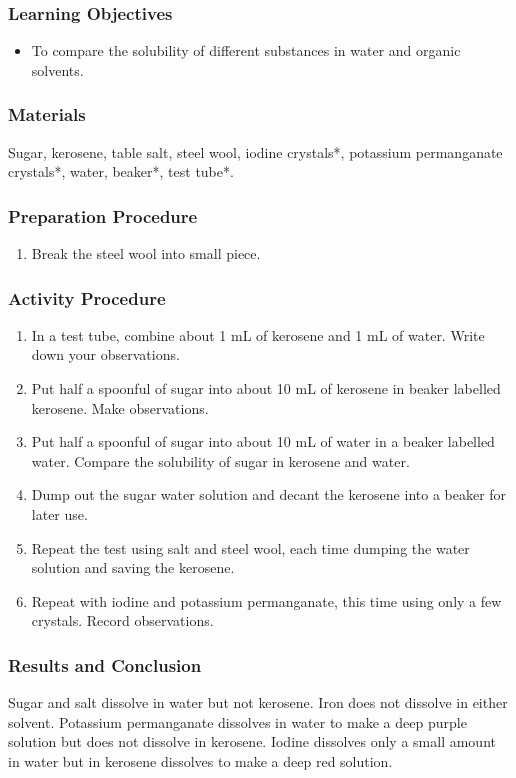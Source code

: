 \subsubsection*{Learning Objectives}
\begin{itemize}
\item{To compare the solubility of different substances in water and organic solvents.}
\end{itemize}

\subsubsection*{Materials}
Sugar, kerosene, table salt, steel wool, iodine crystals*, potassium permanganate crystals*, water, beaker*, test tube*.

\subsubsection*{Preparation Procedure}
\begin{enumerate}
\item{Break the steel wool into small piece.}
\end{enumerate}

\subsubsection*{Activity Procedure}
\begin{enumerate}
\item{In a test tube, combine about 1 mL of kerosene and 1 mL of water. Write down your observations.}
\item{Put half a spoonful of sugar into about 10 mL of kerosene in beaker labelled kerosene. Make observations.}
\item{Put half a spoonful of sugar into about 10 mL of water in a beaker labelled water. Compare the solubility of sugar in kerosene and water.}
\item{Dump out the sugar water solution and decant the kerosene into a beaker for later use.}
\item{Repeat the test using salt and steel wool, each time dumping the water solution and saving the kerosene.}
\item{Repeat with iodine and potassium permanganate, this time using only a few crystals. Record observations.}
\end{enumerate}

\subsubsection*{Results and Conclusion}
Sugar and salt dissolve in water but not kerosene. Iron does not dissolve in either solvent. Potassium permanganate dissolves in water to make a deep purple solution but does not dissolve in kerosene. Iodine dissolves only a small amount in water but in kerosene dissolves to make a deep red solution.

